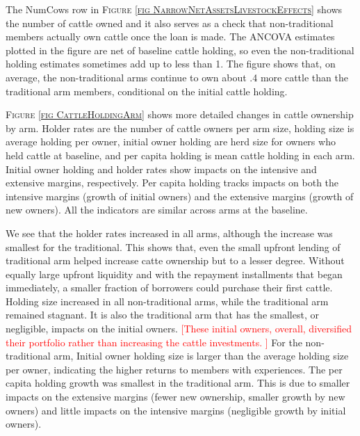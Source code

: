 	The \textsf{NumCows} row in \textsc{\footnotesize Figure \ref{fig NarrowNetAssetsLivestockEffects}} shows the number of cattle owned and it also serves as a check that non-\textsf{traditional} members actually own cattle once the loan is made. The ANCOVA estimates plotted in the figure are net of baseline cattle holding, so even the non-traditional holding estimates sometimes add up to less than 1. %
	The figure shows that, on average, the non-\textsf{traditional} arms continue to own about .4 more cattle than the \textsf{traditional} arm members, conditional on the initial cattle holding. 
	
	\textsc{\footnotesize Figure \ref{fig CattleHoldingArm}} shows more detailed changes in cattle ownership by arm. Holder rates are the number of cattle owners per arm size, holding size is average holding per owner, initial owner holding are herd size for owners who held cattle at baseline, and per capita holding is mean cattle holding in each arm. Initial owner holding and holder rates show impacts on the intensive and extensive margins, respectively. Per capita holding tracks impacts on both the intensive margins (growth of initial owners) and the extensive margins (growth of new owners). All the indicators are similar across arms at the baseline. 
	
	We see that the holder rates increased in all arms, although the increase was smallest for the \textsf{traditional}. This shows that, even the small upfront lending of \textsf{traditional} arm helped increase catte ownership but to a lesser degree. Without equally large upfront liquidity and with the repayment installments that began immediately, a smaller fraction of borrowers could purchase their first cattle. Holding size increased in all non-\textsf{traditional} arms, while the \textsf{traditional} arm remained stagnant. It is also the \textsf{traditional} arm that has the smallest, or negligible, impacts on the initial owners. \textcolor{red}{[These initial owners, overall, diversified their portfolio rather than increasing the cattle investments. ]} For the non-\textsf{traditional} arm, Initial owner holding size is larger than the average holding size per owner, indicating the higher returns to members with experiences. The per capita holding growth was smallest in the \textsf{traditional} arm. This is due to smaller impacts on the extensive margins (fewer new ownership, smaller growth by new owners) and little impacts on the intensive margins (negligible growth by initial owners). 

